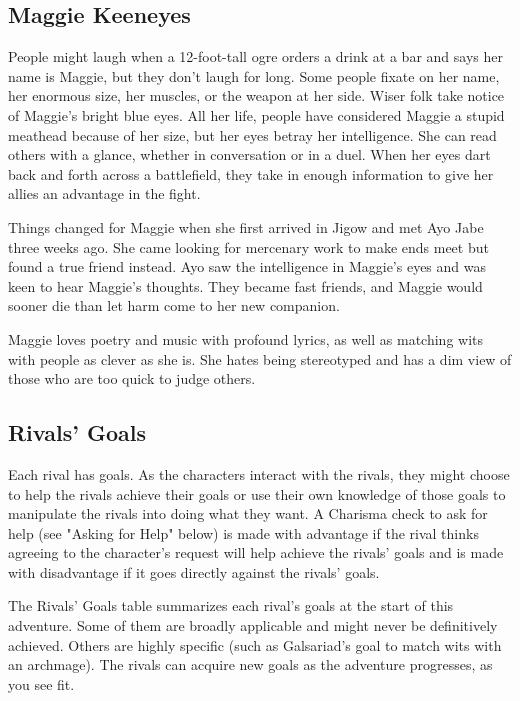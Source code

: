 \documentclass[letterpaper, 11pt, bg=full, twocolumn]{dndbook}
\begin{document}
\subsection{Maggie Keeneyes}


People might laugh when a 12-foot-tall ogre orders a drink at a bar and says her name is Maggie, but they don't laugh for long. Some people fixate on her name, her enormous size, her muscles, or the weapon at her side. Wiser folk take notice of Maggie's bright blue eyes. All her life, people have considered Maggie a stupid meathead because of her size, but her eyes betray her intelligence. She can read others with a glance, whether in conversation or in a duel. When her eyes dart back and forth across a battlefield, they take in enough information to give her allies an advantage in the fight.

Things changed for Maggie when she first arrived in Jigow and met Ayo Jabe three weeks ago. She came looking for mercenary work to make ends meet but found a true friend instead. Ayo saw the intelligence in Maggie's eyes and was keen to hear Maggie's thoughts. They became fast friends, and Maggie would sooner die than let harm come to her new companion.

Maggie loves poetry and music with profound lyrics, as well as matching wits with people as clever as she is. She hates being stereotyped and has a dim view of those who are too quick to judge others.

\subsection{Rivals' Goals}

Each rival has goals. As the characters interact with the rivals, they might choose to help the rivals achieve their goals or use their own knowledge of those goals to manipulate the rivals into doing what they want. A Charisma check to ask for help (see "Asking for Help" below) is made with advantage if the rival thinks agreeing to the character's request will help achieve the rivals' goals and is made with disadvantage if it goes directly against the rivals' goals.

The Rivals' Goals table summarizes each rival's goals at the start of this adventure. Some of them are broadly applicable and might never be definitively achieved. Others are highly specific (such as Galsariad's goal to match wits with an archmage). The rivals can acquire new goals as the adventure progresses, as you see fit.
\end{document}
